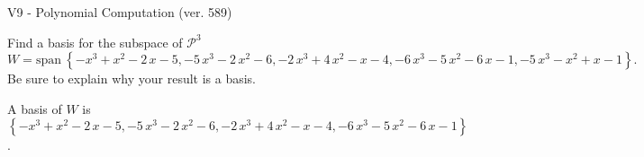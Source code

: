 \begin{exercise}
  \begin{exerciseTitle}V9 - Polynomial Computation (ver. 589)\end{exerciseTitle}
  \begin{exerciseStatement}
    Find a basis for the subspace of \(\mathcal{P}^3\) 
\[W=\mathrm{span}\ \left\{-x^{3} + x^{2} - 2 \, x - 5 , -5 \, x^{3} - 2 \, x^{2} - 6 , -2 \, x^{3} + 4 \, x^{2} - x - 4 , -6 \, x^{3} - 5 \, x^{2} - 6 \, x - 1 , -5 \, x^{3} - x^{2} + x - 1\right\}.\]
 Be sure to explain why your result is a basis.


  \end{exerciseStatement}
  \begin{exerciseAnswer}
   A basis of \(W\) is  \(\left\{-x^{3} + x^{2} - 2 \, x - 5 , -5 \, x^{3} - 2 \, x^{2} - 6 , -2 \, x^{3} + 4 \, x^{2} - x - 4 , -6 \, x^{3} - 5 \, x^{2} - 6 \, x - 1\right\}\).
  


  \end{exerciseAnswer}
\end{exercise}